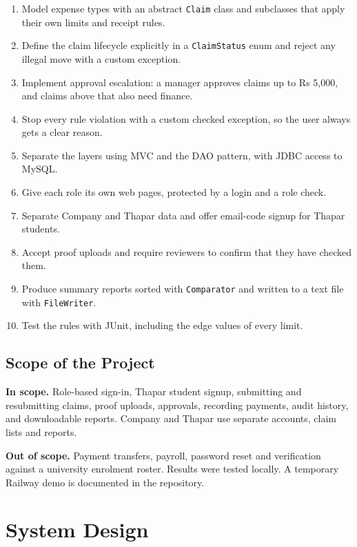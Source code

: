 \documentclass[12pt,a4paper]{report}
\begin{document}
\begin{enumerate}
  \item Model expense types with an abstract \texttt{Claim} class and subclasses that apply their own limits and receipt rules.
  \item Define the claim lifecycle explicitly in a \texttt{ClaimStatus} enum and reject any illegal move with a custom exception.
  \item Implement approval escalation: a manager approves claims up to Rs 5,000, and claims above that also need finance.
  \item Stop every rule violation with a custom checked exception, so the user always gets a clear reason.
  \item Separate the layers using MVC and the DAO pattern, with JDBC access to MySQL.
  \item Give each role its own web pages, protected by a login and a role check.
  \item Separate Company and Thapar data and offer email-code signup for Thapar students.
  \item Accept proof uploads and require reviewers to confirm that they have checked them.
  \item Produce summary reports sorted with \texttt{Comparator} and written to a text file with \texttt{FileWriter}.
  \item Test the rules with JUnit, including the edge values of every limit.
\end{enumerate}

\section{Scope of the Project}

\textbf{In scope.} Role-based sign-in, Thapar student signup, submitting and resubmitting claims, proof uploads, approvals, recording payments, audit history, and downloadable reports. Company and Thapar use separate accounts, claim lists and reports.

\textbf{Out of scope.} Payment transfers, payroll, password reset and verification against a university enrolment roster. Results were tested locally. A temporary Railway demo is documented in the repository.

\chapter{System Design}
\end{document}
